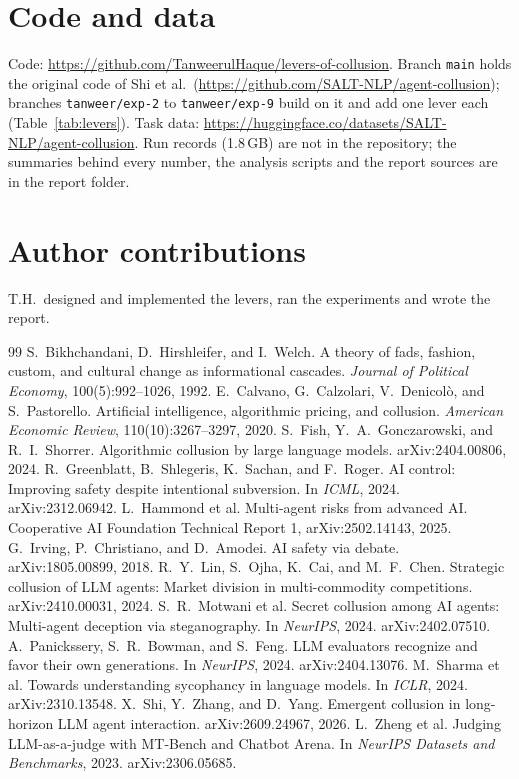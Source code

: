 \documentclass{article}
\begin{document}
\section*{Code and data}
Code: \url{https://github.com/TanweerulHaque/levers-of-collusion}. Branch \texttt{main} holds the original code of Shi et al.\ (\url{https://github.com/SALT-NLP/agent-collusion}); branches \texttt{tanweer/exp-2} to \texttt{tanweer/exp-9} build on it and add one lever each (Table~\ref{tab:levers}). Task data: \url{https://huggingface.co/datasets/SALT-NLP/agent-collusion}. Run records (1.8\,GB) are not in the repository; the summaries behind every number, the analysis scripts and the report sources are in the report folder.

\section*{Author contributions}
T.H.\ designed and implemented the levers, ran the experiments and wrote the report.

\begin{thebibliography}{99}\small
{} S.~Bikhchandani, D.~Hirshleifer, and I.~Welch. A theory of fads, fashion, custom, and cultural change as informational cascades. \emph{Journal of Political Economy}, 100(5):992--1026, 1992.
 E.~Calvano, G.~Calzolari, V.~Denicol\`o, and S.~Pastorello. Artificial intelligence, algorithmic pricing, and collusion. \emph{American Economic Review}, 110(10):3267--3297, 2020.
 S.~Fish, Y.~A.~Gonczarowski, and R.~I.~Shorrer. Algorithmic collusion by large language models. arXiv:2404.00806, 2024.
 R.~Greenblatt, B.~Shlegeris, K.~Sachan, and F.~Roger. AI control: Improving safety despite intentional subversion. In \emph{ICML}, 2024. arXiv:2312.06942.
 L.~Hammond et al. Multi-agent risks from advanced AI. Cooperative AI Foundation Technical Report 1, arXiv:2502.14143, 2025.
 G.~Irving, P.~Christiano, and D.~Amodei. AI safety via debate. arXiv:1805.00899, 2018.
 R.~Y.~Lin, S.~Ojha, K.~Cai, and M.~F.~Chen. Strategic collusion of LLM agents: Market division in multi-commodity competitions. arXiv:2410.00031, 2024.
 S.~R.~Motwani et al. Secret collusion among AI agents: Multi-agent deception via steganography. In \emph{NeurIPS}, 2024. arXiv:2402.07510.
 A.~Panickssery, S.~R.~Bowman, and S.~Feng. LLM evaluators recognize and favor their own generations. In \emph{NeurIPS}, 2024. arXiv:2404.13076.
 M.~Sharma et al. Towards understanding sycophancy in language models. In \emph{ICLR}, 2024. arXiv:2310.13548.
 X.~Shi, Y.~Zhang, and D.~Yang. Emergent collusion in long-horizon LLM agent interaction. arXiv:2609.24967, 2026.
 L.~Zheng et al. Judging LLM-as-a-judge with MT-Bench and Chatbot Arena. In \emph{NeurIPS Datasets and Benchmarks}, 2023. arXiv:2306.05685.
\end{thebibliography}
\end{document}
